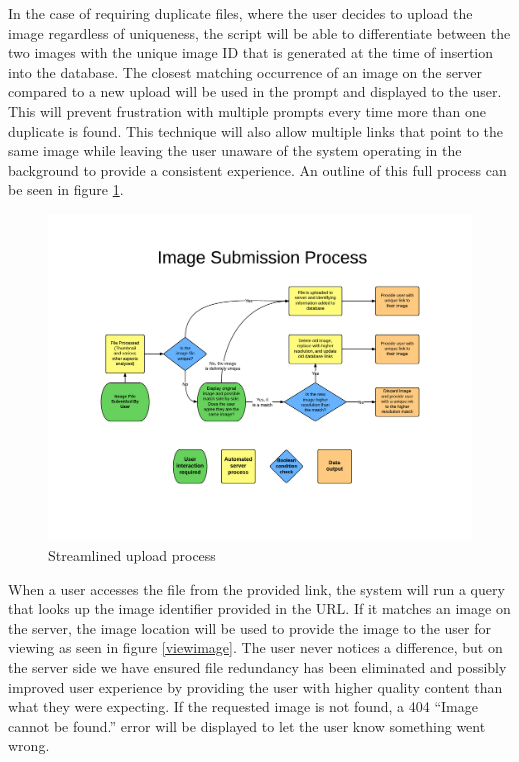 In the case of requiring duplicate files, where the user decides to upload the image regardless of uniqueness, the script will be able to differentiate between the two images with the unique image ID that is generated at the time of insertion into the database. The closest matching occurrence of an image on the server compared to a new upload will be used in the prompt and displayed to the user. This will prevent frustration with multiple prompts every time more than one duplicate is found. This technique will also allow multiple links that point to the same image while leaving the user unaware of the system operating in the background to provide a consistent experience. An outline of this full process can be seen in figure \ref{method-fig1}.

\begin{figure}[htbp]
\centering
\includegraphics[trim={3cm 3.5cm 2cm 4.2cm},clip, width=6in]{upproc}
\caption{Streamlined upload process}
\label{method-fig1}
\end{figure}

When a user accesses the file from the provided link, the system will run a query that looks up the image identifier provided in the URL. If it matches an image on the server, the image location will be used to provide the image to the user for viewing as seen in figure \ref{viewimage}. The user never notices a difference, but on the server side we have ensured file redundancy has been eliminated and possibly improved user experience by providing the user with higher quality content than what they were expecting. If the requested image is not found, a 404 ``Image cannot be found.'' error will be displayed to let the user know something went wrong.

